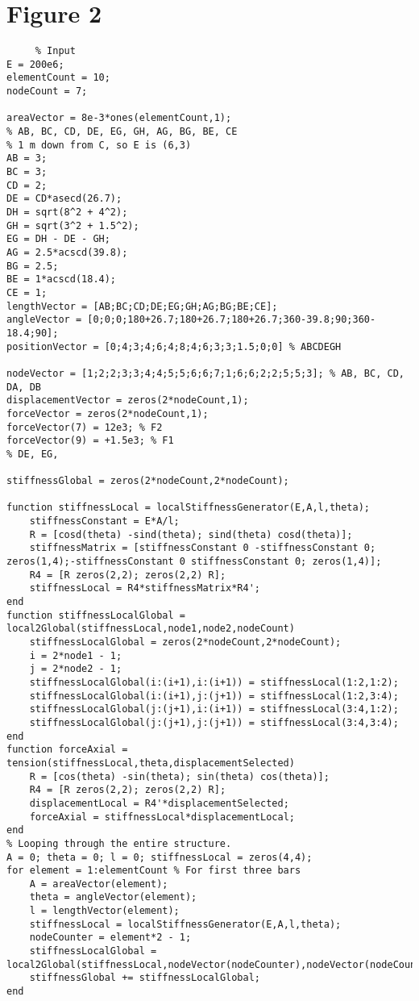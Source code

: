 \documentclass{article}
\begin{document}
\section{Figure 2} %
\label{sec:figure_}
\begin{verbatim}
     % Input
E = 200e6;
elementCount = 10;
nodeCount = 7;

areaVector = 8e-3*ones(elementCount,1);
% AB, BC, CD, DE, EG, GH, AG, BG, BE, CE
% 1 m down from C, so E is (6,3)
AB = 3;
BC = 3;
CD = 2;
DE = CD*asecd(26.7);
DH = sqrt(8^2 + 4^2);
GH = sqrt(3^2 + 1.5^2);
EG = DH - DE - GH;
AG = 2.5*acscd(39.8);
BG = 2.5;
BE = 1*acscd(18.4);
CE = 1;
lengthVector = [AB;BC;CD;DE;EG;GH;AG;BG;BE;CE];
angleVector = [0;0;0;180+26.7;180+26.7;180+26.7;360-39.8;90;360-18.4;90];
positionVector = [0;4;3;4;6;4;8;4;6;3;3;1.5;0;0] % ABCDEGH

nodeVector = [1;2;2;3;3;4;4;5;5;6;6;7;1;6;6;2;2;5;5;3]; % AB, BC, CD, DA, DB
displacementVector = zeros(2*nodeCount,1);
forceVector = zeros(2*nodeCount,1);
forceVector(7) = 12e3; % F2
forceVector(9) = +1.5e3; % F1
% DE, EG,

stiffnessGlobal = zeros(2*nodeCount,2*nodeCount);

function stiffnessLocal = localStiffnessGenerator(E,A,l,theta);
    stiffnessConstant = E*A/l;
    R = [cosd(theta) -sind(theta); sind(theta) cosd(theta)];
    stiffnessMatrix = [stiffnessConstant 0 -stiffnessConstant 0; zeros(1,4);-stiffnessConstant 0 stiffnessConstant 0; zeros(1,4)];
    R4 = [R zeros(2,2); zeros(2,2) R];
    stiffnessLocal = R4*stiffnessMatrix*R4';
end
function stiffnessLocalGlobal = local2Global(stiffnessLocal,node1,node2,nodeCount)
    stiffnessLocalGlobal = zeros(2*nodeCount,2*nodeCount);
    i = 2*node1 - 1;
    j = 2*node2 - 1;
    stiffnessLocalGlobal(i:(i+1),i:(i+1)) = stiffnessLocal(1:2,1:2);
    stiffnessLocalGlobal(i:(i+1),j:(j+1)) = stiffnessLocal(1:2,3:4);
    stiffnessLocalGlobal(j:(j+1),i:(i+1)) = stiffnessLocal(3:4,1:2);
    stiffnessLocalGlobal(j:(j+1),j:(j+1)) = stiffnessLocal(3:4,3:4);
end
function forceAxial = tension(stiffnessLocal,theta,displacementSelected)
    R = [cos(theta) -sin(theta); sin(theta) cos(theta)];
    R4 = [R zeros(2,2); zeros(2,2) R];
    displacementLocal = R4'*displacementSelected;
    forceAxial = stiffnessLocal*displacementLocal;
end
% Looping through the entire structure.
A = 0; theta = 0; l = 0; stiffnessLocal = zeros(4,4);
for element = 1:elementCount % For first three bars
    A = areaVector(element);
    theta = angleVector(element);
    l = lengthVector(element);
    stiffnessLocal = localStiffnessGenerator(E,A,l,theta);
    nodeCounter = element*2 - 1;
    stiffnessLocalGlobal = local2Global(stiffnessLocal,nodeVector(nodeCounter),nodeVector(nodeCounter+1),nodeCount);
    stiffnessGlobal += stiffnessLocalGlobal;
end


\end{verbatim}
\end{document}
